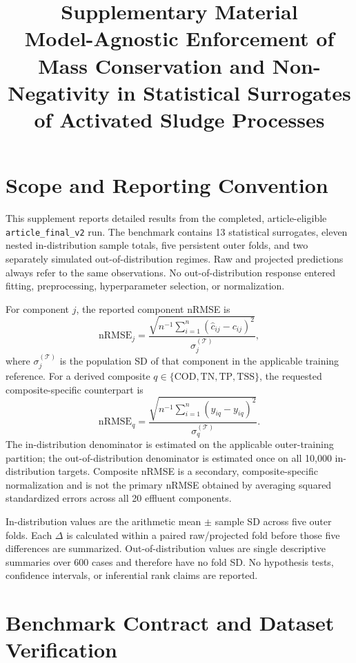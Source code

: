 \documentclass[a4paper,10pt]{article}
\title{Supplementary Material\\Model-Agnostic Enforcement of Mass Conservation and Non-Negativity in Statistical Surrogates of Activated Sludge Processes}
\author{}
\date{}
\begin{document}
\maketitle

\section{Scope and Reporting Convention}

This supplement reports detailed results from the completed, article-eligible \texttt{article\_final\_v2} run. The benchmark contains 13 statistical surrogates, eleven nested in-distribution sample totals, five persistent outer folds, and two separately simulated out-of-distribution regimes. Raw and projected predictions always refer to the same observations. No out-of-distribution response entered fitting, preprocessing, hyperparameter selection, or normalization.

For component $j$, the reported component nRMSE is
\begin{equation}
\mathrm{nRMSE}_j=
\frac{\sqrt{n^{-1}\sum_{i=1}^{n}(\hat c_{ij}-c_{ij})^2}}
{\sigma_j^{(\mathcal T)}},
\end{equation}
where $\sigma_j^{(\mathcal T)}$ is the population SD of that component in the applicable training reference. For a derived composite $q\in\{\mathrm{COD},\mathrm{TN},\mathrm{TP},\mathrm{TSS}\}$, the requested composite-specific counterpart is
\begin{equation}
\mathrm{nRMSE}_q=
\frac{\sqrt{n^{-1}\sum_{i=1}^{n}(\hat y_{iq}-y_{iq})^2}}
{\sigma_q^{(\mathcal T)}}.
\end{equation}
The in-distribution denominator is estimated on the applicable outer-training partition; the out-of-distribution denominator is estimated once on all 10,000 in-distribution targets. Composite nRMSE is a secondary, composite-specific normalization and is not the primary nRMSE obtained by averaging squared standardized errors across all 20 effluent components.

In-distribution values are the arithmetic mean $\pm$ sample SD across five outer folds. Each $\Delta$ is calculated within a paired raw/projected fold before those five differences are summarized. Out-of-distribution values are single descriptive summaries over 600 cases and therefore have no fold SD. No hypothesis tests, confidence intervals, or inferential rank claims are reported.

\section{Benchmark Contract and Dataset Verification}
\end{document}

